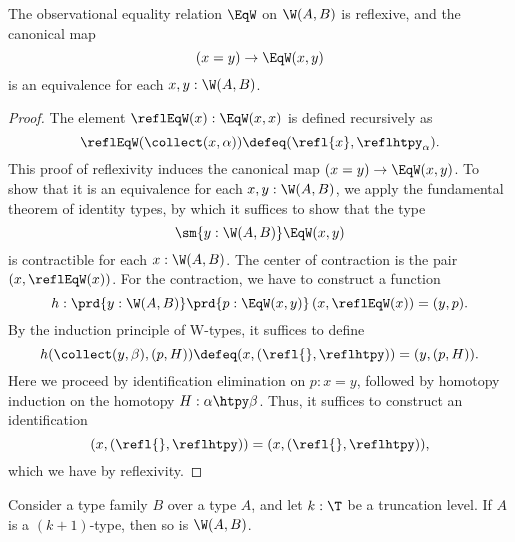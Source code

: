 \begin{thm}\label{thm:EqW}
  The observational equality relation $\EqW$ on $\W(A,B)$ is reflexive, and the canonical map
  \begin{equation*}
    (x=y)\to \EqW(x,y)
  \end{equation*}
  is an equivalence for each $x,y:\W(A,B)$. 
\end{thm}

\begin{proof}
  The element $\reflEqW(x):\EqW(x,x)$ is defined recursively as
  \begin{equation*}
    \reflEqW(\collect(x,\alpha))\defeq (\refl{x},\reflhtpy_\alpha).
  \end{equation*}
  This proof of reflexivity induces the canonical map $(x=y)\to\EqW(x,y)$. To show that it is an equivalence for each $x,y:\W(A,B)$, we apply the fundamental theorem of identity types, by which it suffices to show that the type
  \begin{equation*}
    \sm{y:\W(A,B)}\EqW(x,y)
  \end{equation*}
  is contractible for each $x:\W(A,B)$. The center of contraction is the pair $(x,\reflEqW(x))$. For the contraction, we have to construct a function
  \begin{equation*}
    h:\prd{y:\W(A,B)}\prd{p:\EqW(x,y)}\,(x,\reflEqW(x))=(y,p).
  \end{equation*}
  By the induction principle of W-types, it suffices to define
  \begin{equation*}
    h(\collect(y,\beta),(p,H))\defeq (x,(\refl{},\reflhtpy))=(y,(p,H)).
  \end{equation*}
  Here we proceed by identification elimination on $p:x=y$, followed by homotopy induction on the homotopy $H:\alpha\htpy \beta$. Thus, it suffices to construct an identification
  \begin{equation*}
    (x,(\refl{},\reflhtpy))=(x,(\refl{},\reflhtpy)),
  \end{equation*}
  which we have by reflexivity.
\end{proof}

\begin{thm}
  Consider a type family $B$ over a type $A$, and let $k:\T$ be a truncation level. If $A$ is a $(k+1)$-type, then so is $\W(A,B)$.
\end{thm}

